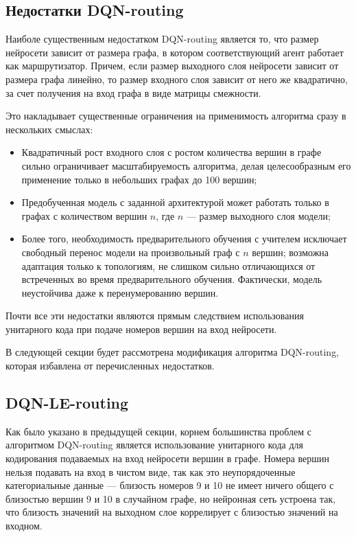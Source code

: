 \documentclass[specification,annotation,times]{itmo-student-thesis}
\theoremstyle{definition}
\begin{document}
\subsection{Недостатки DQN-routing}

Наиболе существенным недостатком DQN-routing является то, что размер нейросети
зависит от размера графа, в котором соответствующий агент работает как
маршрутизатор. Причем, если размер выходного слоя нейросети зависит от размера
графа линейно, то размер входного слоя зависит от него же квадратично, за счет
получения на вход графа в виде матрицы смежности.

Это накладывает существенные ограничения на применимость алгоритма сразу в
нескольких смыслах:

\begin{itemize}
\item Квадратичный рост входного слоя с ростом количества вершин в графе сильно
  ограничивает масштабируемость алгоритма, делая целесообразным его применение
  только в небольших графах до 100 вершин;
\item Предобученная модель с заданной архитектурой может работать только в
  графах с количеством вершин $n$, где $n$ --- размер выходного слоя модели;
\item Более того, необходимость предварительного обучения с учителем исключает
  свободный перенос модели на произвольный граф с $n$ вершин; возможна адаптация
  только к топологиям, не слишком сильно отличающихся от встреченных во время
  предварительного обучения. Фактически, модель неустойчива даже к
  перенумерованию вершин.
\end{itemize}

Почти все эти недостатки являются прямым следствием использования унитарного
кода при подаче номеров вершин на вход нейросети.

В следующей секции будет рассмотрена модификация алгоритма DQN-routing, которая
избавлена от перечисленных недостатков.

\subsection{DQN-LE-routing}

Как было указано в предыдущей секции, корнем большинства проблем с алгоритмом
DQN-routing является использование унитарного кода для кодирования подаваемых на
вход нейросети вершин в графе. Номера вершин нельзя подавать на вход в чистом
виде, так как это неупорядоченные категориальные данные --- близость номеров 9 и
10 не имеет ничего общего с близостью вершин 9 и 10 в случайном графе, но
нейронная сеть устроена так, что близость значений на выходном слое коррелирует
с близостью значений на входном.
\end{document}
